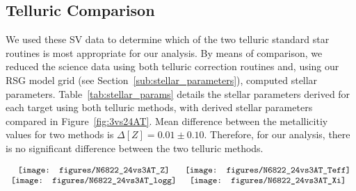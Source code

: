 \documentclass[manuscript]{aastex}
\begin{document}

\subsection{Telluric Comparison} %
\label{sub:telluric_comparison}

We used these SV data to determine which of the two telluric standard star routines is most appropriate for our analysis.
By means of comparison, we reduced the science data using both telluric correction routines and, using our RSG model grid
(see Section~\ref{sub:stellar_parameters}), computed stellar parameters.
Table~\ref{tab:stellar_params} details the stellar parameters derived for each target using both telluric methods, with derived stellar parameters compared in
Figure~\ref{fig:3vs24AT}.
Mean difference between the metallicitiy values for two methods is
$\Delta [Z] = 0.01\pm 0.10$.
Therefore, for our analysis, there is no significant difference between the two telluric methods.


\begin{figure*}
 \begin{center}$
  \centering
  \begin{array}{cc}
  \texttt{[image: figures/N6822\_24vs3AT\_Z]} &
  \texttt{[image: figures/N6822\_24vs3AT\_Teff]} \\
  \texttt{[image: figures/N6822\_24vs3AT\_logg]} &
  \texttt{[image: figures/N6822\_24vs3AT\_Xi]} \\
  \end{array}$
 \end{center}
 \caption{
            Comparison of the final model parameters using the two different telluric methods.
            Top left: metallicity ([Z]), mean difference
            $<\Delta[Z]> ~= 0.04 \pm 0.07$.
            Top right: effective temperature (T$_{eff}$), mean difference
            $<\Delta T_{eff}> ~= -14 \pm 42$.
            Bottom left: surface gravity (log $g$), mean difference
            $<\Delta$ log\,$g> ~= -0.06 \pm 0.12$.
            Bottom right: Microturbulence ($\xi$), mean difference
            $<\Delta \xi> ~= -0.1 \pm 0.1$.
            Black solid lines indicates direct correlation between the two methods.
            Green dashed lines indicates linear best fit to data.
            In all cases, the distributions are statistically consistent with a one-to-one ratio (black lines).
          }
 \label{fig:3vs24AT}
\end{figure*}
\end{document}
